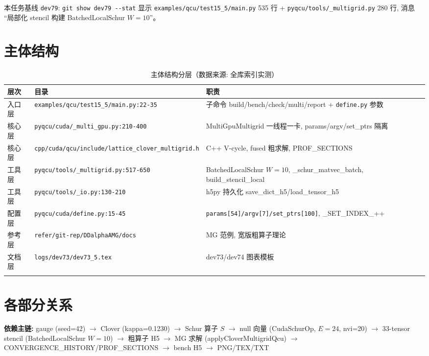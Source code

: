 \documentclass[UTF8]{ctexart}
\begin{document}
\noindent 本任务基线 \texttt{\nolinkurl{dev79}}: \texttt{\nolinkurl{git show dev79 --stat}} 显示 \texttt{\nolinkurl{examples/qcu/test15_5/main.py}} 535 行 + \texttt{\nolinkurl{pyqcu/tools/_multigrid.py}} 280 行, 消息 ``局部化 stencil 构建 BatchedLocalSchur $W=10$''。

\section{主体结构}
\begin{xltabular}{\textwidth}{llX}
\toprule
\textcolor{struct}{层次} & 目录 & \textcolor{struct}{职责} \\
\midrule
\endhead
入口层 & \texttt{\nolinkurl{examples/qcu/test15_5/main.py:22-35}} & 子命令 build/bench/check/multi/report + \texttt{\nolinkurl{define.py}} 参数 \\
核心层 & \texttt{\nolinkurl{pyqcu/cuda/_multi_gpu.py:210-400}} & MultiGpuMultigrid 一线程一卡, params/argv/set\_ptrs 隔离 \\
核心层 & \texttt{\nolinkurl{cpp/cuda/qcu/include/lattice_clover_multigrid.h}} & C++ V-cycle, fused 粗求解, PROF\_SECTIONS \\
工具层 & \texttt{\nolinkurl{pyqcu/tools/_multigrid.py:517-650}} & BatchedLocalSchur $W=10$, \_schur\_matvec\_batch, build\_stencil\_local \\
工具层 & \texttt{\nolinkurl{pyqcu/tools/_io.py:130-210}} & h5py 持久化 save\_dict\_h5/load\_tensor\_h5 \\
配置层 & \texttt{\nolinkurl{pyqcu/cuda/define.py:15-45}} & \texttt{\nolinkurl{params[54]/argv[7]/set_ptrs[100]}}, \_SET\_INDEX\_++ \\
参考层 & \texttt{\nolinkurl{refer/git-rep/DDalphaAMG/docs}} & MG 范例, 宽版粗算子理论 \\
文档层 & \texttt{\nolinkurl{logs/dev73/dev73_5.tex}} & dev73/dev74 图表模板 \\
\bottomrule
\caption{主体结构分层（数据来源: 全库索引实测）}
\end{xltabular}

\section{各部分关系}
\begin{keybox}
\textbf{依赖主链:} \textcolor{relation}{gauge (seed=42) $\to$ Clover (kappa=0.1230) $\to$ Schur 算子 $S$ $\to$ null 向量 (CudaSchurOp, $E=24$, nvi=20) $\to$ 33-tensor stencil (BatchedLocalSchur $W=10$) $\to$ 粗算子 H5 $\to$ MG 求解 (applyCloverMultigridQcu) $\to$ CONVERGENCE\_HISTORY/PROF\_SECTIONS $\to$ bench H5 $\to$ PNG/TEX/TXT}
\end{keybox}
\end{document}

